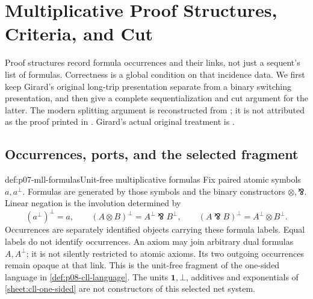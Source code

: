\chapter{Multiplicative Proof Structures, Criteria, and Cut}
\label{sec:p07-multiplicative-proof-nets}

Proof structures record formula occurrences and their links, not just a
sequent's list of formulas. Correctness is a global condition on that
incidence data. We first keep Girard's original long-trip presentation
separate from a binary switching presentation, and then give a complete
sequentialization and cut argument for the latter. The modern splitting
argument is reconstructed from
\cite[pp.~1--5]{DiGuardiaLaurentTortoraVaux2023Sequentialization};
it is not attributed as the proof printed in
\cite{DanosRegnier1989}. Girard's actual original treatment is
\cite[Section~2, pp.~28--47]{Girard1987AuthorHosted}.

\section{Occurrences, ports, and the selected fragment}
\label{sec:p07-mll-objects}

\begin{hbdefinition}{def:p07-mll-formulas}{Unit-free multiplicative formulas}
Fix paired atomic symbols \(a,a^\perp\). Formulas are generated by those
symbols and the binary constructors \(\otimes,\bindnasrepma\). Linear
negation is the involution determined by
\[
 (a^\perp)^\perp=a,\qquad
 (A\otimes B)^\perp=A^\perp\bindnasrepma B^\perp,\qquad
 (A\bindnasrepma B)^\perp=A^\perp\otimes B^\perp.
\]
Occurrences are separately identified objects carrying these formula labels.
Equal labels do not identify occurrences. An axiom may join arbitrary
dual formulas \(A,A^\perp\); it is not silently restricted to atomic
axioms. Its two outgoing occurrences remain opaque at that link.
This is the unit-free fragment of the one-sided language in
\cref{def:p08-cll-language}. The units \(\mathbf1,\bot\), additives and
exponentials of \cref{sheet:cll-one-sided} are not constructors of this
selected net system.
\end{hbdefinition}

